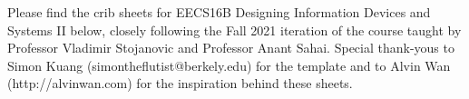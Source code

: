 \documentclass[10pt, article, oneside]{memoir}
\begin{document}
	\maketitle
	
	Please find the crib sheets for EECS16B Designing Information Devices and Systems II below, closely following the Fall 2021 iteration of the course taught by Professor Vladimir Stojanovic and Professor Anant Sahai. Special thank-yous to Simon Kuang (simontheflutist@berkely.edu) for the template and to Alvin Wan (http://alvinwan.com) for the inspiration behind these sheets.
	
	\newpage
	\tableofcontents*
	
	\newpage
	
\end{document}
